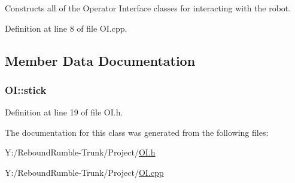 \-Constructs all of the \-Operator \-Interface classes for interacting with the robot. 



\-Definition at line 8 of file \-O\-I.\-cpp.



\subsection{\-Member \-Data \-Documentation}
\hypertarget{class_o_i_a7d11d42696e135b067edd10f24597326}{
\subsubsection[{stick}]{ {\bf \-O\-I\-::stick}}}\label{class_o_i_a7d11d42696e135b067edd10f24597326}


\-Definition at line 19 of file \-O\-I.\-h.



\-The documentation for this class was generated from the following files\-:\begin{DoxyCompactItemize}
\item 
\-Y\-:/\-Rebound\-Rumble-\/\-Trunk/\-Project/\hyperlink{_o_i_8h}{\-O\-I.\-h}\item 
\-Y\-:/\-Rebound\-Rumble-\/\-Trunk/\-Project/\hyperlink{_o_i_8cpp}{\-O\-I.\-cpp}\end{DoxyCompactItemize}

